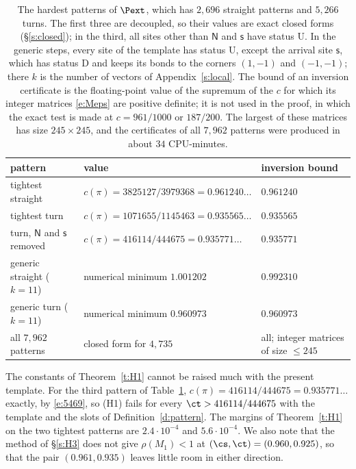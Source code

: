 \begin{table}[ht]
\centering
\small
\begin{tabular}{lll}
pattern & value & inversion bound \\ \hline
tightest straight & $c(\pi) = 3825127/3979368 = 0.961240\ldots$ & $0.961240$ \\
tightest turn & $c(\pi) = 1071655/1145463 = 0.935565\ldots$ & $0.935565$ \\
turn, $\mathsf N$ and $\mathsf s$ removed & $c(\pi) = 416114/444675 = 0.935771\ldots$ & $0.935771$ \\
generic straight ($k = 11$) & numerical minimum $1.001202$ & $0.992310$ \\
generic turn ($k = 11$) & numerical minimum $0.960973$ & $0.960973$ \\ \hline
all $7{,}962$ patterns & closed form for $4{,}735$ & all; integer matrices of size $\le 245$
\end{tabular}
\caption{The hardest patterns of $\Pext$, which has $2{,}696$ straight patterns and $5{,}266$ turns. The first three are decoupled, so their values are exact closed forms (\S\ref{s:closed}); in the third, all sites other than $\mathsf N$ and $\mathsf s$ have status $\mathrm U$. In the generic steps, every site of the template has status $\mathrm U$, except the arrival site $\mathsf s$, which has status $\mathrm D$ and keeps its bonds to the corners $(1, -1)$ and $(-1, -1)$; there $k$ is the number of vectors of Appendix~\ref{s:local}. The bound of an inversion certificate is the floating-point value of the supremum of the $c$ for which its integer matrices \eqref{e:Meps} are positive definite; it is not used in the proof, in which the exact test is made at $c = 961/1000$ or $187/200$. The largest of these matrices has size $245 \times 245$, and the certificates of all $7{,}962$ patterns were produced in about $34$ CPU-minutes.}\label{tab:H1}
\end{table}

\begin{remark}\label{r:H1sharp}
The constants of Theorem~\ref{t:H1} cannot be raised much with the present template. For the third pattern of Table~\ref{tab:H1}, $c(\pi) = 416114/444675 = 0.935771\ldots$ exactly, by \eqref{e:5469}, so (H1) fails for every $\ct > 416114/444675$ with the template and the slots of Definition~\ref{d:pattern}. The margins of Theorem~\ref{t:H1} on the two tightest patterns are $2.4 \cdot 10^{-4}$ and $5.6 \cdot 10^{-4}$. We also note that the method of \S\ref{s:H3} does not give $\rho(M_1) < 1$ at $(\cs, \ct) = (0.960, 0.925)$, so that the pair $(0.961, 0.935)$ leaves little room in either direction.
\end{remark}
